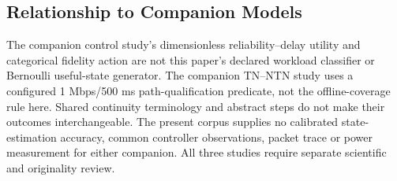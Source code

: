 \subsection{Relationship to Companion Models}
The companion control study's dimensionless reliability--delay utility and categorical fidelity action are not this paper's declared workload classifier or Bernoulli useful-state generator. The companion TN--NTN study uses a configured 1 Mbps/500 ms path-qualification predicate, not the offline-coverage rule here. Shared continuity terminology and abstract steps do not make their outcomes interchangeable. The present corpus supplies no calibrated state-estimation accuracy, common controller observations, packet trace or power measurement for either companion. All three studies require separate scientific and originality review.
